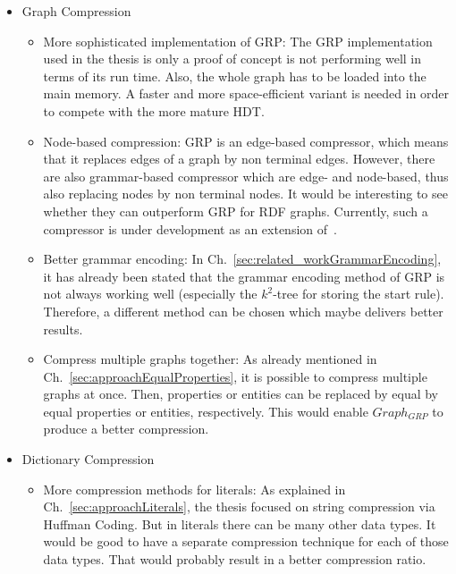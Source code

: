 \begin{itemize}
	\item Graph Compression
	\begin{itemize}
		\item More sophisticated implementation of GRP: The GRP implementation used in the thesis is only a proof of concept is not performing well in terms of its run time. Also, the whole graph has to be loaded into the main memory. A faster and more space-efficient variant is needed in order to compete with the more mature HDT.
		\item Node-based compression: GRP is an edge-based compressor, which means that it replaces edges of a graph by non terminal edges. However, there are also grammar-based compressor which are edge- and node-based, thus also replacing nodes by non terminal nodes. It would be interesting to see whether they can outperform GRP for RDF graphs. Currently, such a compressor is under development as an extension of~\cite{mattdk}.
		\item Better grammar encoding: In Ch.~\ref{sec:related_workGrammarEncoding}, it has already been stated that the grammar encoding method of GRP is not always working well (especially the $k^2$-tree for storing the start rule). Therefore, a different method can be chosen which maybe delivers better results.
		\item Compress multiple graphs together: As already mentioned in Ch.~\ref{sec:approachEqualProperties}, it is possible to compress multiple graphs at once. Then, properties or entities can be replaced by equal by equal properties or entities, respectively. This would enable $Graph_{GRP}$ to produce a better compression.
	\end{itemize}
	\item Dictionary Compression
	\begin{itemize}
		\item More compression methods for literals: As explained in Ch.~\ref{sec:approachLiterals}, the thesis focused on string compression via Huffman Coding. But in literals there can be many other data types. It would be good to have a separate compression technique for each of those data types. That would probably result in a better compression ratio.
	\end{itemize}
\end{itemize}


